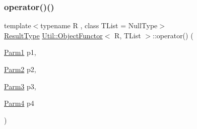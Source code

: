 \mbox{\label{classUtil_1_1ObjectFunctor_a87c6264782e6c535c3a66f385d922f12}} 
\subsubsection{\texorpdfstring{operator()()}{operator()()}\hspace{0.1cm}{\footnotesize\ttfamily [9/12]}}
{\footnotesize\ttfamily template$<$typename R , class T\+List  = Null\+Type$>$ \\
\mbox{\hyperlink{classUtil_1_1ObjectFunctor_a77f816e98108848347d0dfc085090a1c}{Result\+Type}} \mbox{\hyperlink{classUtil_1_1ObjectFunctor}{Util\+::\+Object\+Functor}}$<$ R, T\+List $>$\+::operator() (\begin{DoxyParamCaption}\item[{\mbox{\hyperlink{classUtil_1_1ObjectFunctor_a199715d28029627c2ae7219c13b04d26}{Parm1}}}]{p1,  }\item[{\mbox{\hyperlink{classUtil_1_1ObjectFunctor_a6809cf65883dc7575e01d9b9849649cf}{Parm2}}}]{p2,  }\item[{\mbox{\hyperlink{classUtil_1_1ObjectFunctor_a6becd26610c6091b9ba93cd96f3def66}{Parm3}}}]{p3,  }\item[{\mbox{\hyperlink{classUtil_1_1ObjectFunctor_a54ce0b64981cd7f558ce8eea7df3f1b2}{Parm4}}}]{p4 }\end{DoxyParamCaption})\hspace{0.3cm}{\ttfamily [inline]}}

\mbox{\label{classUtil_1_1ObjectFunctor_a87c6264782e6c535c3a66f385d922f12}} 
